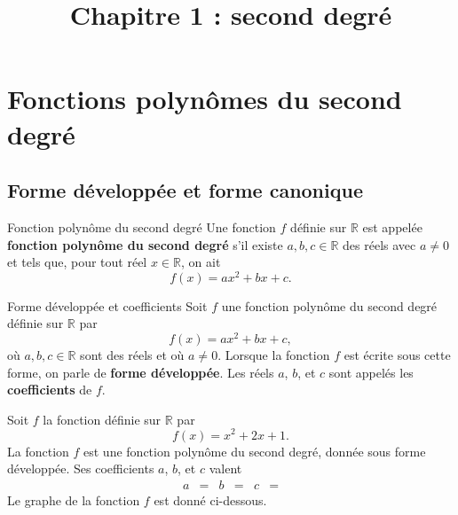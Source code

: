 \documentclass[11pt]{article}
\title{Chapitre 1 : second degré}
\date{}
\author{}
\begin{document}
\maketitle\thispagestyle{fancy}

\section{Fonctions polynômes du second degré}
\subsection{Forme développée et forme canonique}
\begin{defi}{Fonction polynôme du second degré}
  Une fonction $f$ définie sur $\mathbb{R}$ est appelée \textbf{fonction polynôme
  du second degré} s'il existe $a, b, c\in\mathbb{R}$ des réels avec $a\neq0$ et
  tels que, pour tout réel $x\in\mathbb{R}$, on ait
  \[
    f(x) = ax^2+bx+c.
  \]
\end{defi}

\begin{defi}{Forme développée et coefficients}
  Soit $f$ une fonction polynôme du second degré définie sur $\mathbb{R}$ par
  \[
    f(x) = ax^2+bx+c,
  \]
  où $a,b,c\in\mathbb{R}$ sont des réels et où $a\neq0$. Lorsque la fonction $f$
  est écrite sous cette forme, on parle de \textbf{forme développée}. Les réels
  $a$, $b$, et $c$ sont appelés les \textbf{coefficients} de $f$.
\end{defi}

\begin{exemple}
  Soit $f$ la fonction définie sur $\mathbb{R}$ par
  \[
    f(x) = x^2+2x+1.
  \]
  La fonction $f$ est une fonction polynôme du second degré, donnée sous forme
  développée. Ses coefficients $a$, $b$, et $c$ valent
  \begin{align*}
    a &= &
    b &= &
    c &=
  \end{align*}
  Le graphe de la fonction $f$ est donné ci-dessous.
\begin{center}
\end{center}
\end{exemple}
\end{document}
